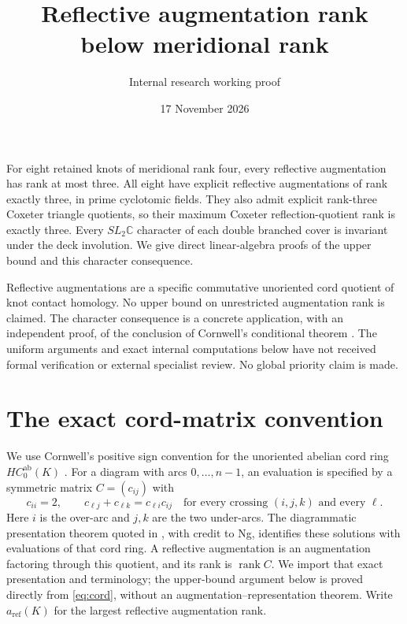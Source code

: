 \documentclass[11pt]{article}
\title{Reflective augmentation rank below meridional rank}
\author{Internal research working proof}
\date{17 November 2026}
\newcommand{\rank}{\operatorname{rank}}
\newcommand{\C}{\mathbb C}
\begin{document}
\maketitle

For eight retained knots of meridional rank four, every reflective
augmentation has rank at most three. All eight have explicit reflective augmentations of rank exactly
three, in prime cyclotomic fields. They also admit explicit
rank-three Coxeter triangle quotients, so their maximum Coxeter
reflection-quotient rank is exactly three. Every
$SL_2\C$ character of each double branched cover is invariant under
the deck involution. We give direct linear-algebra proofs of the
upper bound and this character consequence.

Reflective augmentations are a specific commutative unoriented cord
quotient of knot contact homology. No upper bound on unrestricted
augmentation rank is claimed. The character consequence is a concrete
application, with an independent proof, of the conclusion of
Cornwell's conditional theorem \cite[Theorems 1.1 and 5.5]{cornwell}.
The uniform arguments and exact internal computations below have not
received formal verification or external specialist review. No global
priority claim is made.

\section{The exact cord-matrix convention}

We use Cornwell's positive sign convention for the unoriented abelian
cord ring $HC_0^{\mathrm{ab}}(K)$ \cite[Definitions 3.1, 3.3 and 3.4]{cornwell}.
For a diagram with arcs $0,\ldots,n-1$, an evaluation is specified by a
symmetric matrix $C=(c_{ij})$ with
\begin{equation}\label{eq:cord}
 c_{ii}=2,\qquad c_{\ell j}+c_{\ell k}=c_{\ell i}c_{ij}
 \quad\text{for every crossing }(i,j,k)\text{ and every }\ell.
\end{equation}
Here $i$ is the over-arc and $j,k$ are the two under-arcs.
The diagrammatic presentation theorem quoted in
\cite[Theorem 3.2]{cornwell}, with credit to Ng, identifies these
solutions with evaluations of that cord ring.
A reflective augmentation is an augmentation factoring through this
quotient, and its rank is $\rank C$. We import that exact presentation
and terminology; the upper-bound argument below is proved directly
from \eqref{eq:cord}, without an augmentation--representation theorem.
Write $a_{\mathrm{ref}}(K)$ for the largest reflective augmentation rank.
\end{document}
